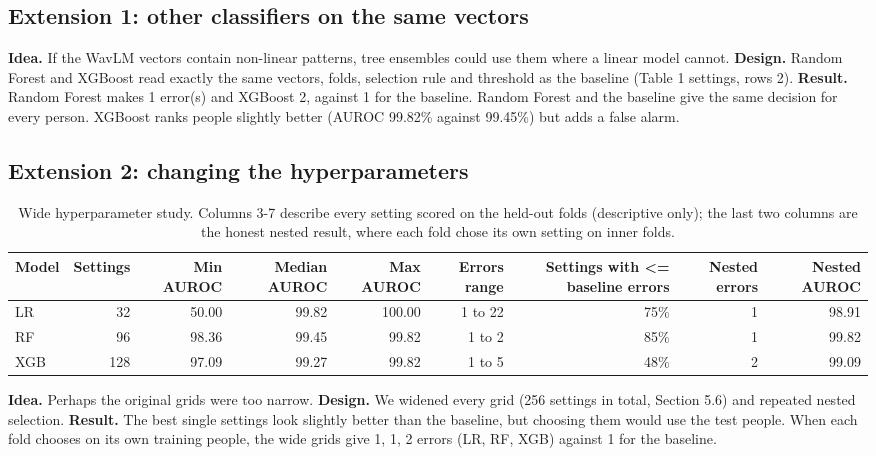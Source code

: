 \documentclass[11pt,a4paper]{article}
\begin{document}
\subsection{Extension 1: other classifiers on the same vectors}\label{sec:ext1}
\textbf{Idea.} If the WavLM vectors contain non-linear patterns, tree ensembles could use them where a linear model cannot. \textbf{Design.} Random Forest and XGBoost read exactly the same vectors, folds, selection rule and threshold as the baseline (Table 1 settings, rows 2). \textbf{Result.} Random Forest makes 1 error(s) and XGBoost 2, against 1 for the baseline. Random Forest and the baseline give the same decision for every person. XGBoost ranks people slightly better (AUROC 99.82\% against 99.45\%) but adds a false alarm.

\subsection{Extension 2: changing the hyperparameters}\label{sec:ext2}
\begin{table}[H]\centering\scriptsize\renewcommand{\arraystretch}{1.15}
\caption{Wide hyperparameter study. Columns 3-7 describe every setting scored on the held-out folds (descriptive only); the last two columns are the honest nested result, where each fold chose its own setting on inner folds.}
\begin{tabular}{lrrrrrrrr}
\toprule
\textbf{Model} & \textbf{Settings} & \textbf{Min AUROC} & \textbf{Median AUROC} & \textbf{Max AUROC} & \textbf{Errors range} & \textbf{Settings with <= baseline errors} & \textbf{Nested errors} & \textbf{Nested AUROC}\\
\midrule
LR & 32 & 50.00 & 99.82 & 100.00 & 1 to 22 & 75\% & 1 & 98.91\\
RF & 96 & 98.36 & 99.45 & 99.82 & 1 to 2 & 85\% & 1 & 99.82\\
XGB & 128 & 97.09 & 99.27 & 99.82 & 1 to 5 & 48\% & 2 & 99.09\\
\bottomrule
\end{tabular}\end{table}
\textbf{Idea.} Perhaps the original grids were too narrow. \textbf{Design.} We widened every grid (256 settings in total, Section 5.6) and repeated nested selection. \textbf{Result.} The best single settings look slightly better than the baseline, but choosing them would use the test people. When each fold chooses on its own training people, the wide grids give 1, 1, 2 errors (LR, RF, XGB) against 1 for the baseline.
\end{document}
